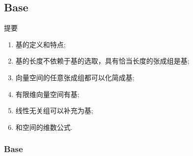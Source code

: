 \documentclass{ctexart}
\begin{document}
\newpage


\subsection{Base}
\noindent 提要
\begin{enumerate}
    \item 基的定义和特点;
    \item 基的长度不依赖于基的选取，具有恰当长度的张成组是基;
    \item 向量空间的任意张成组都可以化简成基;
    \item 有限维向量空间有基;
    \item 线性无关组可以补充为基;
    \item 和空间的维数公式.
\end{enumerate}

\subsubsection{Base}









\newpage
\end{document}
